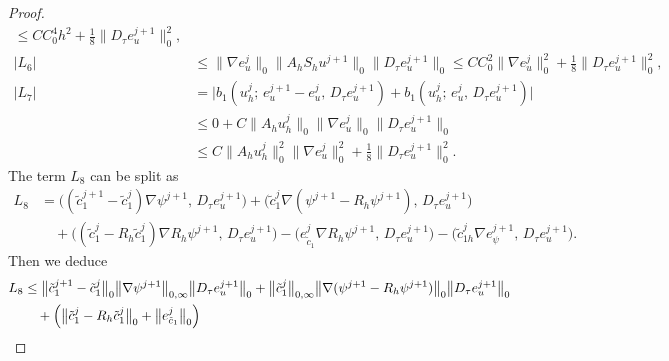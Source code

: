 \begin{proof}
\begin{align}
           \leq CC_{0}^{4}h^{2}
              + \frac{1}{8}\bigl\|D_{\tau}e_{u}^{j+1}\bigr\|_{0}^{2},
  \label{eq:L5}\\[4pt]
  |L_{6}| &\leq \bigl\|\nabla e_{u}^{j}\bigr\|_{0}
                \bigl\|A_{h}S_{h}u^{j+1}\bigr\|_{0}
                \bigl\|D_{\tau}e_{u}^{j+1}\bigr\|_{0}
           \leq CC_{0}^{2}\bigl\|\nabla e_{u}^{j}\bigr\|_{0}^{2}
              + \frac{1}{8}\bigl\|D_{\tau}e_{u}^{j+1}\bigr\|_{0}^{2},
  \label{eq:L6}\\[4pt]
  |L_{7}| &= \bigl|b_{1}(u_{h}^{j};\, e_{u}^{j+1} - e_{u}^{j},\, D_{\tau}e_{u}^{j+1})
              + b_{1}(u_{h}^{j};\, e_{u}^{j},\, D_{\tau}e_{u}^{j+1})\bigr|
  \nonumber\\
          &\leq 0
             + C\bigl\|A_{h}u_{h}^{j}\bigr\|_{0}
               \bigl\|\nabla e_{u}^{j}\bigr\|_{0}
               \bigl\|D_{\tau}e_{u}^{j+1}\bigr\|_{0}
  \nonumber\\
          &\leq C\bigl\|A_{h}u_{h}^{j}\bigr\|_{0}^{2}
               \bigl\|\nabla e_{u}^{j}\bigr\|_{0}^{2}
             + \frac{1}{8}\bigl\|D_{\tau}e_{u}^{j+1}\bigr\|_{0}^{2}.
  \label{eq:L7}
\end{align}
The term $L_{8}$ can be split as
\begin{align}
  L_{8} &= \bigl((\tilde{c}_{1}^{j+1} - \tilde{c}_{1}^{j})\nabla\psi^{j+1},\,
                 D_{\tau}e_{u}^{j+1}\bigr)
          + \bigl(\tilde{c}_{1}^{j}\nabla(\psi^{j+1} - R_{h}\psi^{j+1}),\,
                 D_{\tau}e_{u}^{j+1}\bigr)
  \nonumber\\
  &\quad + \bigl((\tilde{c}_{1}^{j} - R_{h}\tilde{c}_{1}^{j})\nabla R_{h}\psi^{j+1},\,
                 D_{\tau}e_{u}^{j+1}\bigr)
          - \bigl(e_{\tilde{c}_{1}}^{j}\nabla R_{h}\psi^{j+1},\,
                 D_{\tau}e_{u}^{j+1}\bigr)
          - \bigl(\tilde{c}_{1h}^{j}\nabla e_{\psi}^{j+1},\,
                 D_{\tau}e_{u}^{j+1}\bigr).
  \label{eq:L8-split}
\end{align}
Then we deduce
\begin{align}
  L_{8}
  &\leq \bigl\|\tilde{c}_{1}^{j+1} - \tilde{c}_{1}^{j}\bigr\|_{0}
         \bigl\|\nabla\psi^{j+1}\bigr\|_{0,\infty}
         \bigl\|D_{\tau}e_{u}^{j+1}\bigr\|_{0}
       + \bigl\|\tilde{c}_{1}^{j}\bigr\|_{0,\infty}
         \bigl\|\nabla(\psi^{j+1} - R_{h}\psi^{j+1})\bigr\|_{0}
         \bigl\|D_{\tau}e_{u}^{j+1}\bigr\|_{0}
  \nonumber\\
  &\quad + \Bigl(\bigl\|\tilde{c}_{1}^{j} - R_{h}\tilde{c}_{1}^{j}\bigr\|_{0}
               + \bigl\|e_{\tilde{c}_{1}}^{j}\bigr\|_{0}\Bigr)

\end{align}
\end{proof}
